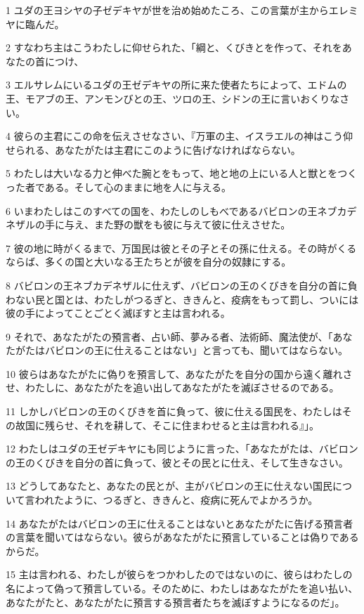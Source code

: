 \par 1 ユダの王ヨシヤの子ゼデキヤが世を治め始めたころ、この言葉が主からエレミヤに臨んだ。
\par 2 すなわち主はこうわたしに仰せられた、「綱と、くびきとを作って、それをあなたの首につけ、
\par 3 エルサレムにいるユダの王ゼデキヤの所に来た使者たちによって、エドムの王、モアブの王、アンモンびとの王、ツロの王、シドンの王に言いおくりなさい。
\par 4 彼らの主君にこの命を伝えさせなさい、『万軍の主、イスラエルの神はこう仰せられる、あなたがたは主君にこのように告げなければならない。
\par 5 わたしは大いなる力と伸べた腕とをもって、地と地の上にいる人と獣とをつくった者である。そして心のままに地を人に与える。
\par 6 いまわたしはこのすべての国を、わたしのしもべであるバビロンの王ネブカデネザルの手に与え、また野の獣をも彼に与えて彼に仕えさせた。
\par 7 彼の地に時がくるまで、万国民は彼とその子とその孫に仕える。その時がくるならば、多くの国と大いなる王たちとが彼を自分の奴隷にする。
\par 8 バビロンの王ネブカデネザルに仕えず、バビロンの王のくびきを自分の首に負わない民と国とは、わたしがつるぎと、ききんと、疫病をもって罰し、ついには彼の手によってことごとく滅ぼすと主は言われる。
\par 9 それで、あなたがたの預言者、占い師、夢みる者、法術師、魔法使が、「あなたがたはバビロンの王に仕えることはない」と言っても、聞いてはならない。
\par 10 彼らはあなたがたに偽りを預言して、あなたがたを自分の国から遠く離れさせ、わたしに、あなたがたを追い出してあなたがたを滅ぼさせるのである。
\par 11 しかしバビロンの王のくびきを首に負って、彼に仕える国民を、わたしはその故国に残らせ、それを耕して、そこに住まわせると主は言われる』」。
\par 12 わたしはユダの王ゼデキヤにも同じように言った、「あなたがたは、バビロンの王のくびきを自分の首に負って、彼とその民とに仕え、そして生きなさい。
\par 13 どうしてあなたと、あなたの民とが、主がバビロンの王に仕えない国民について言われたように、つるぎと、ききんと、疫病に死んでよかろうか。
\par 14 あなたがたはバビロンの王に仕えることはないとあなたがたに告げる預言者の言葉を聞いてはならない。彼らがあなたがたに預言していることは偽りであるからだ。
\par 15 主は言われる、わたしが彼らをつかわしたのではないのに、彼らはわたしの名によって偽って預言している。そのために、わたしはあなたがたを追い払い、あなたがたと、あなたがたに預言する預言者たちを滅ぼすようになるのだ」。

